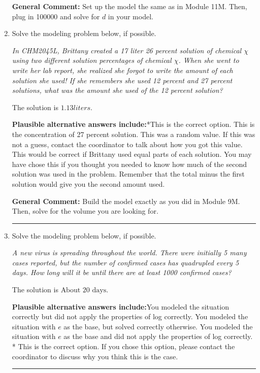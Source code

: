 \documentclass{extbook}[14pt]
\newcommand{\litem}[1]{\item #1

\rule{\textwidth}{0.4pt}}
\begin{document}
\begin{enumerate}
{\textbf{General Comment:} Set up the model the same as in Module 11M. Then, plug in 100000 and solve for $d$ in your model.
}
\litem{
Solve the modeling problem below, if possible.

\begin{center}
    \textit{ In CHM2045L, Brittany created a 17 liter 26 percent solution of chemical $\chi$ using two different solution percentages of chemical $\chi$. When she went to write her lab report, she realized she forgot to write the amount of each solution she used! If she remembers she used 12 percent and 27 percent solutions, what was the amount she used of the 12 percent solution? }
\end{center}
The solution is \( 1.13 liters \).\begin{enumerate}[label=\Alph*.]
\textbf{Plausible alternative answers include:}*This is the correct option.
This is the concentration of 27 percent solution.
This was a random value. If this was not a guess, contact the coordinator to talk about how you got this value.
This would be correct if Brittany used equal parts of each solution.
You may have chose this if you thought you needed to know how much of the second solution was used in the problem. Remember that the total minus the first solution would give you the second amount used.
\end{enumerate}

\textbf{General Comment:} Build the model exactly as you did in Module 9M. Then, solve for the volume you are looking for.
}
\litem{
Solve the modeling problem below, if possible.

\begin{center}
    \textit{ A new virus is spreading throughout the world. There were initially 5 many cases reported, but the number of confirmed cases has quadrupled every 5 days. How long will it be until there are at least 1000 confirmed cases? }
\end{center}
The solution is \( \text{About } 20 \text{ days} \).\begin{enumerate}[label=\Alph*.]
\textbf{Plausible alternative answers include:}You modeled the situation correctly but did not apply the properties of log correctly.
You modeled the situation with $e$ as the base, but solved correctly otherwise.
You modeled the situation with $e$ as the base and did not apply the properties of log correctly.
* This is the correct option.
If you chose this option, please contact the coordinator to discuss why you think this is the case.
\end{enumerate}

}
\end{enumerate}
\end{document}
